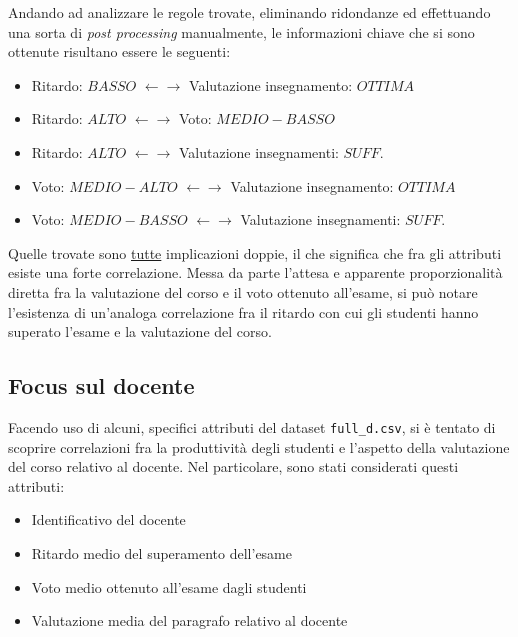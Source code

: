             Andando ad analizzare le regole trovate, eliminando ridondanze ed effettuando una sorta di \textit{post processing} manualmente, le informazioni chiave che si sono ottenute risultano essere le seguenti:

            \begin{itemize}
                \item Ritardo: $BASSO$ $\leftarrow \rightarrow$ Valutazione insegnamento: $OTTIMA$
                \item Ritardo: $ALTO$ $\leftarrow \rightarrow$ Voto: $MEDIO-BASSO$
                \item Ritardo: $ALTO$ $\leftarrow \rightarrow$ Valutazione insegnamenti: $SUFF.$
                \item Voto: $MEDIO-ALTO$ $\leftarrow \rightarrow$ Valutazione insegnamento: $OTTIMA$
                \item Voto: $MEDIO-BASSO$ $\leftarrow \rightarrow$ Valutazione insegnamenti: $SUFF.$
            \end{itemize}

            Quelle trovate sono \underline{tutte} implicazioni doppie, il che significa che fra gli attributi esiste una forte correlazione. Messa da parte l'attesa e apparente proporzionalità diretta fra la valutazione del corso e il voto ottenuto all'esame, si può notare l'esistenza di un'analoga correlazione fra il ritardo con cui gli studenti hanno superato l'esame e la valutazione del corso.

        \subsection{Focus sul docente}

            Facendo uso di alcuni, specifici attributi del dataset \texttt{full\_d.csv}, si è tentato di scoprire correlazioni fra la produttività degli studenti e l'aspetto della valutazione del corso relativo al docente. Nel particolare, sono stati considerati questi attributi:

            \begin{itemize}
                \item Identificativo del docente
                \item Ritardo medio del superamento dell'esame
                \item Voto medio ottenuto all'esame dagli studenti
                \item Valutazione media del paragrafo relativo al docente
            \end{itemize}

